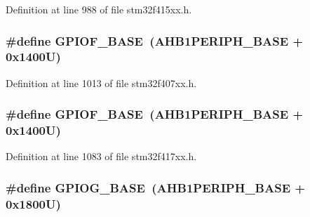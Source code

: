 Definition at line 988 of file stm32f415xx.\+h.

\subsubsection[{\texorpdfstring{G\+P\+I\+O\+F\+\_\+\+B\+A\+SE}{GPIOF_BASE}}]{\setlength{\rightskip}{0pt plus 5cm}\#define G\+P\+I\+O\+F\+\_\+\+B\+A\+SE~({\bf A\+H\+B1\+P\+E\+R\+I\+P\+H\+\_\+\+B\+A\+SE} + 0x1400\+U)}\hypertarget{group___peripheral__registers__structures_ga7f9a3f4223a1a784af464a114978d26e}{}\label{group___peripheral__registers__structures_ga7f9a3f4223a1a784af464a114978d26e}


Definition at line 1013 of file stm32f407xx.\+h.

\subsubsection[{\texorpdfstring{G\+P\+I\+O\+F\+\_\+\+B\+A\+SE}{GPIOF_BASE}}]{\setlength{\rightskip}{0pt plus 5cm}\#define G\+P\+I\+O\+F\+\_\+\+B\+A\+SE~({\bf A\+H\+B1\+P\+E\+R\+I\+P\+H\+\_\+\+B\+A\+SE} + 0x1400\+U)}\hypertarget{group___peripheral__registers__structures_ga7f9a3f4223a1a784af464a114978d26e}{}\label{group___peripheral__registers__structures_ga7f9a3f4223a1a784af464a114978d26e}


Definition at line 1083 of file stm32f417xx.\+h.

\subsubsection[{\texorpdfstring{G\+P\+I\+O\+G\+\_\+\+B\+A\+SE}{GPIOG_BASE}}]{\setlength{\rightskip}{0pt plus 5cm}\#define G\+P\+I\+O\+G\+\_\+\+B\+A\+SE~({\bf A\+H\+B1\+P\+E\+R\+I\+P\+H\+\_\+\+B\+A\+SE} + 0x1800\+U)}\hypertarget{group___peripheral__registers__structures_ga5d8ca4020f2e8c00bde974e8e7c13cfe}{}\label{group___peripheral__registers__structures_ga5d8ca4020f2e8c00bde974e8e7c13cfe}



